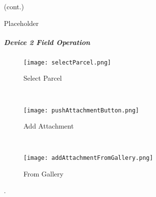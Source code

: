 (cont.)
\vspace{.5in}

\vspace{2.75in}

\vspace{3in}

\noindent Placeholder
\clearpage
\subparagraph{Device 2 Field Operation}

\begin{wrapfigure}{r}{0.4\textwidth}
\centering
    \texttt{[image: selectParcel.png]}
\caption {Select Parcel}
\vspace{.1in}

\HRule \\[.4cm] %
\vspace{.1in}

    \texttt{[image: pushAttachmentButton.png]}
\caption{Add Attachment}
\vspace{.1in}

\HRule \\[.4cm] %
\vspace{.05in}

    \texttt{[image: addAttachmentFromGallery.png]}
\caption{From Gallery}
\end{wrapfigure}

.

\vspace{.5in}

\vspace{3in}

\vspace{3in}

